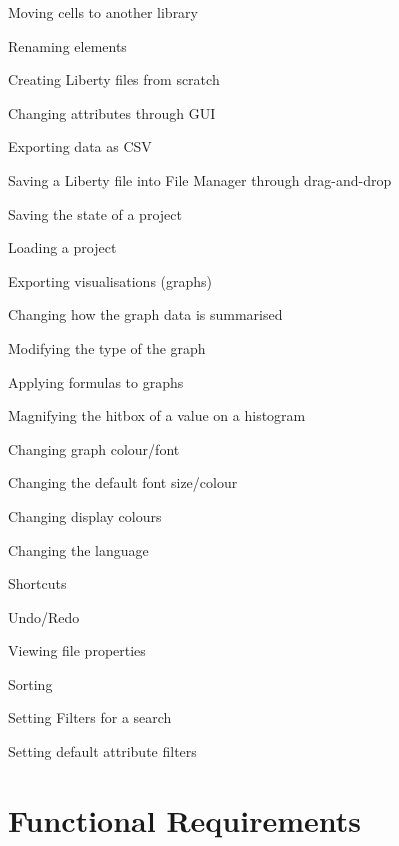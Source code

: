 \documentclass[10pt,a4paper]{report}
\begin{document}
\begin{FRO}
    \item Moving cells to another library \label{FRO-1}
    \item Renaming elements \label{FRO-2}
    \item Creating Liberty files from scratch \label{FRO-3}
    \item Changing attributes through GUI \label{FRO-4}
    \item Exporting data as CSV \label{FRO-5}
    \item Saving a Liberty file into File Manager through drag-and-drop \label{FRO-6}
    \item Saving the state of a project \label{FRO-7}
    \item Loading a project \label{FRO-8}
    \item Exporting visualisations (graphs) \label{FRO-9}
    \item Changing how the graph data is summarised \label{FRO-10}
    \item Modifying the type of the graph \label{FRO-11}
    \item Applying formulas to graphs \label{FRO-12}
    \item Magnifying the hitbox of a value on a histogram \label{FRO-13}
    \item Changing graph colour/font \label{FRO-14}
    \item Changing the default font size/colour \label{FRO-15}
    \item Changing display colours \label{FRO-16}
    \item Changing the language \label{FRO-17}
    \item Shortcuts \label{FRO-18}
    \item Undo/Redo \label{FRO-19}
    \item Viewing file properties \label{FRO-20}
    \item Sorting \label{FRO-21}
    \item Setting Filters for a search \label{FRO-22}
    \item Setting default attribute filters\label{FRO-23}
\end{FRO}

\section{Functional Requirements}
\end{document}
